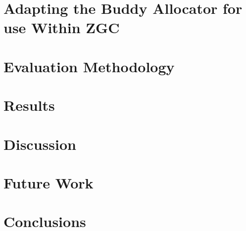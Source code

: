 \documentclass[a4paper,12pt]{article}
\begin{document}
\clearpage
\section{Adapting the Buddy Allocator for use Within ZGC}
\label{sec:adaptations}


% 

\newpage
\section{Evaluation Methodology}
\label{sec:evaluation}


\newpage
\section{Results}
\label{sec:results}


\newpage
\section{Discussion}
\label{sec:discussion}


\newpage
\section{Future Work}
\label{sec:futurework}


\newpage
\section{Conclusions}
\label{sec:conclusions}


\newpage



%


%
\end{document}

